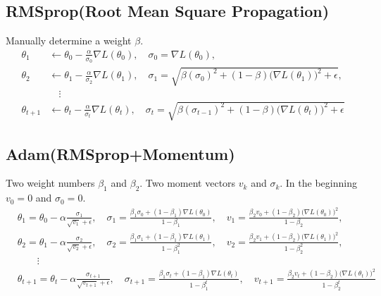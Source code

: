 \documentclass[../main.tex]{subfiles}
\begin{document}
        \subsection{RMSprop(Root Mean Square Propagation)}
            Manually determine a weight $\beta$.
            \begin{align*}
                \theta_1 & \leftarrow \theta_0 - \frac{\alpha}{\sigma_0}\nabla L(\theta_{0}),\quad\sigma_0 = \nabla L(\theta_{0}), \\
                \theta_2 & \leftarrow \theta_1 - \frac{\alpha}{\sigma_2}\nabla L(\theta_{1}),\quad\sigma_1 = \sqrt{\beta(\sigma_0)^2 + (1-\beta)\big(\nabla L(\theta_{1})\big)^2 + \epsilon}, \\
                         &\quad\vdots\\
                \theta_{t+1} & \leftarrow \theta_t - \frac{\alpha}{\sigma_t}\nabla L(\theta_{t}),\quad\sigma_t = \sqrt{\beta(\sigma_{t-1})^2+(1-\beta)\big(\nabla L(\theta_{t})\big)^2 + \epsilon}
            \end{align*}
        \subsection{Adam(RMSprop+Momentum)}
            Two weight numbers $\beta_1$ and $\beta_2$.  Two moment vectors $v_k$ and $\sigma_k$. In the beginning $v_0=0$ and $\sigma_0=0$.
            \begin{align*}
                &\theta_1 = \theta_0 - \alpha\frac{\sigma_1}{\sqrt{v_1}+\epsilon},\quad\sigma_1 = \frac{\beta_1\sigma_0+(1-\beta_1)\nabla L(\theta_0)}{1-\beta_1},\quad v_1=\frac{\beta_2 v_0+(1-\beta_2)\big(\nabla L(\theta_0)\big)^2}{1-\beta_2}, \\
                &\theta_2 = \theta_1 - \alpha\frac{\sigma_2}{\sqrt{v_2}+\epsilon},\quad\sigma_2=\frac{\beta_1\sigma_1+(1-\beta_1)\nabla L(\theta_1)}{1-\beta_1^2},\quad v_2 = \frac{\beta_2 v_1+(1-\beta_2)\big(\nabla L(\theta_1)\big)^2}{1-\beta_2^2}, \\
                    &\qquad\vdots\\
                &\theta_{t+1}=\theta_t-\alpha\frac{\sigma_{t+1}}{\sqrt{v_{t+1}}+\epsilon},\quad\sigma_{t+1}=\frac{\beta_1\sigma_t+(1-\beta_1)\nabla L(\theta_t)}{1-\beta_1^t},\quad v_{t+1}=\frac{\beta_2 v_t+(1-\beta_2)\big(\nabla L(\theta_t)\big)^2}{1-\beta_2^t}
            \end{align*}
        
\end{document}
